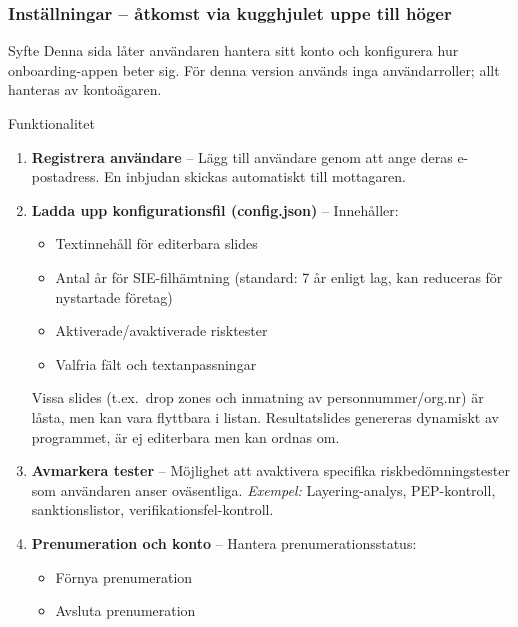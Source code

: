 \documentclass[10pt]{beamer}
\begin{document}
\begin{frame}[fragile]
  \frametitle{Inställningar – åtkomst via kugghjulet uppe till höger}

  \begin{block}{Syfte}
    Denna sida låter användaren hantera sitt konto och konfigurera hur onboarding-appen beter sig.
    För denna version används inga användarroller; allt hanteras av kontoägaren.
  \end{block}

  \vspace{0.4cm}

  \begin{block}{Funktionalitet}
    \begin{enumerate}
      \item \textbf{Registrera användare} – Lägg till användare genom att ange deras e-postadress.
      En inbjudan skickas automatiskt till mottagaren.
      \vspace{0.2cm}
      \item \textbf{Ladda upp konfigurationsfil (config.json)} – Innehåller:
        \begin{itemize}
          \item Textinnehåll för editerbara slides
          \item Antal år för SIE-filhämtning (standard: 7 år enligt lag, kan reduceras för nystartade företag)
          \item Aktiverade/avaktiverade risktester
          \item Valfria fält och textanpassningar
        \end{itemize}
      Vissa slides (t.ex.\ drop zones och inmatning av personnummer/org.nr) är låsta, men kan vara flyttbara i listan.
      Resultatslides genereras dynamiskt av programmet, är ej editerbara men kan ordnas om.
      \vspace{0.2cm}
      \item \textbf{Avmarkera tester} – Möjlighet att avaktivera specifika riskbedömningstester som användaren anser oväsentliga.
      \textit{Exempel:} Layering-analys, PEP-kontroll, sanktionslistor, verifikationsfel-kontroll.
      \vspace{0.2cm}
      \item \textbf{Prenumeration och konto} – Hantera prenumerationsstatus:
        \begin{itemize}
          \item Förnya prenumeration
          \item Avsluta prenumeration

\end{itemize}
\end{enumerate}
\end{block}
\end{frame}
\end{document}
